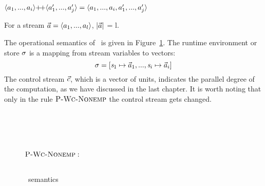 \begin{nota}
	$\vapp{\vrange{a_1}{a_i}} {\vrange{a_1'}{a_j'}} = \langle a_1,...,a_i,a_1',...,a_j' \rangle $ \\
\end{nota}

\begin{nota}
	For a stream $\a = \< a_1,...,a_l \'>$, $|\vec a|$ = l. \\
\end{nota}

The operational semantics of \fmsvcode \  is given in Figure~\ref{fig-svcode-semantics}.
The runtime environment or store $\sigma$ is a mapping from stream variables to vectors:
$$\sgm = [\s_1 \|-> {\a_1},...,\s_i \|-> {\a_i}]$$
The control stream $\vec c$, which is a vector of units, indicates the parallel degree of the computation, as we have discussed in the last chapter. 
It is worth noting that only in the rule $\textsc{P-Wc-Nonemp}$ the control stream gets changed.


\begin{figure}[H]\large 
	
	\\
	
	
	 \\[2ex]
	
	 \\[4ex]
	
	\\[2ex]
	$\textsc{P-Wc-Nonemp}:$\\
		\\[4ex]
	
	
	\caption{\fmsvcode \  semantics}
	\label{fig-svcode-semantics}
\end{figure}

